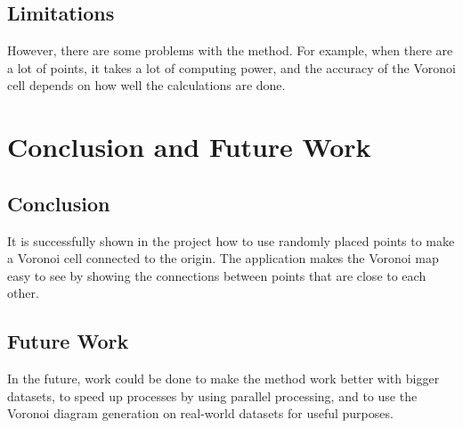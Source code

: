 \documentclass[12pt,a4paper]{report}
\begin{document}
\section{Limitations}
However, there are some problems with the method. For example, when there are a lot of points, it takes a lot of computing power, and the accuracy of the Voronoi cell depends on how well the calculations are done.


\chapter{Conclusion and Future Work}

\section{Conclusion}
It is successfully shown in the project how to use randomly placed points to make a Voronoi cell connected to the origin. The application makes the Voronoi map easy to see by showing the connections between points that are close to each other.


\section{Future Work}
In the future, work could be done to make the method work better with bigger datasets, to speed up processes by using parallel processing, and to use the Voronoi diagram generation on real-world datasets for useful purposes.
\end{document}
